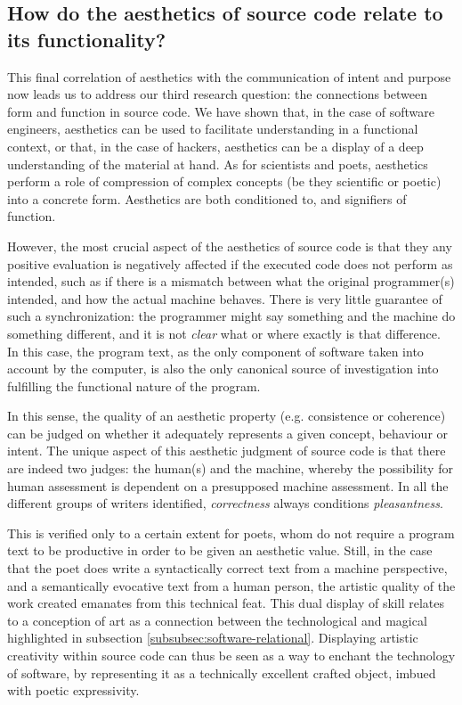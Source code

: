 \subsection{How do the aesthetics of source code relate to its functionality?}
\label{subsec:conclusion-rq-3}

This final correlation of aesthetics with the communication of intent and purpose now leads us to address our third research question: the connections between form and function in source code. We have shown that, in the case of software engineers, aesthetics can be used to facilitate understanding in a functional context, or that, in the case of hackers, aesthetics can be a display of a deep understanding of the material at hand. As for scientists and poets, aesthetics perform a role of compression of complex concepts (be they scientific or poetic) into a concrete form. Aesthetics are both conditioned to, and signifiers of function.

However, the most crucial aspect of the aesthetics of source code is that they any positive evaluation is negatively affected if the executed code does not perform as intended, such as if there is a mismatch between what the original programmer(s) intended, and how the actual machine behaves. There is very little guarantee of such a synchronization: the programmer might say something and the machine do something different, and it is not \emph{clear} what or where exactly is that difference. In this case, the program text, as the only component of software taken into account by the computer, is also the only canonical source of investigation into fulfilling the functional nature of the program.

In this sense, the quality of an aesthetic property (e.g. consistence or coherence) can be judged on whether it adequately represents a given concept, behaviour or intent. The unique aspect of this aesthetic judgment of source code is that there are indeed two judges: the human(s) and the machine, whereby the possibility for human assessment is dependent on a presupposed machine assessment. In all the different groups of writers identified, \emph{correctness} always conditions \emph{pleasantness}.

This is verified only to a certain extent for poets, whom do not require a program text to be productive in order to be given an aesthetic value. Still, in the case that the poet does write a syntactically correct text from a machine perspective, and a semantically evocative text from a human person, the artistic quality of the work created emanates from this technical feat. This dual display of skill relates to a conception of art as a connection between the technological and magical highlighted in subsection \ref{subsubsec:software-relational}. Displaying artistic creativity within source code can thus be seen as a way to enchant the technology of software, by representing it as a technically excellent crafted object, imbued with poetic expressivity.

